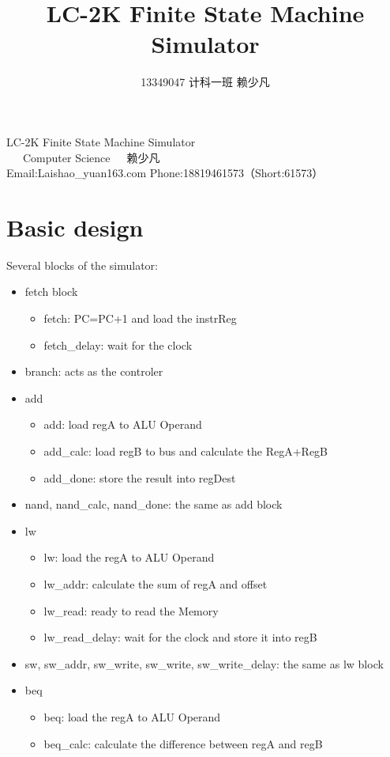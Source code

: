 \documentclass[a4paper]{article}
\author{13349047 计科一班 赖少凡}
\title{LC-2K Finite State Machine Simulator}
\newcommand{\titlefont}{\fontsize{14pt}{\baselineskip}\selectfont}
\newcommand{\docfont}{\fontsize{12pt}{\baselineskip}\selectfont}
\newcommand{\tablefont}{\fontsize{8pt}{\baselineskip}\selectfont}
\begin{document}
\titlefont
\begin{center}
LC-2K Finite State Machine Simulator\\
\tablefont
\docfont
13349047~~~Computer Science~~~赖少凡\\
Email:Laishao\_yuan\@163.com 
Phone:18819461573（Short:61573）
\end{center}

\section{Basic design}
	Several blocks of the simulator:
	\begin{itemize}
		\item fetch block
			\begin{itemize}
				\item fetch: PC=PC+1 and load the instrReg
				\item fetch\_delay: wait for the clock
	    	 	  \end{itemize}
	    	\item branch: acts as the controler
	    	\item add
	    		\begin{itemize}
	    			\item add: load regA to ALU Operand
	    			\item add\_calc: load regB to bus and calculate the RegA+RegB
	    			\item add\_done: store the result into regDest
	    		\end{itemize}
	    	\item nand, nand\_calc, nand\_done: the same as add block
	    	\item lw
	    		\begin{itemize}
	    			\item lw: load the regA to ALU Operand
	    			\item lw\_addr: calculate the sum of regA and offset
	    			\item lw\_read: ready to read the Memory
	    			\item lw\_read\_delay: wait for the clock and store it into regB
	    		\end{itemize}
	    	\item sw, sw\_addr, sw\_write, sw\_write, sw\_write\_delay: the same as lw block
	    	\item beq
	    		\begin{itemize}
	    			\item beq: load the regA to ALU Operand
	    			\item beq\_calc: calculate the difference between regA and regB

\end{itemize}
\end{itemize}
\end{document}
